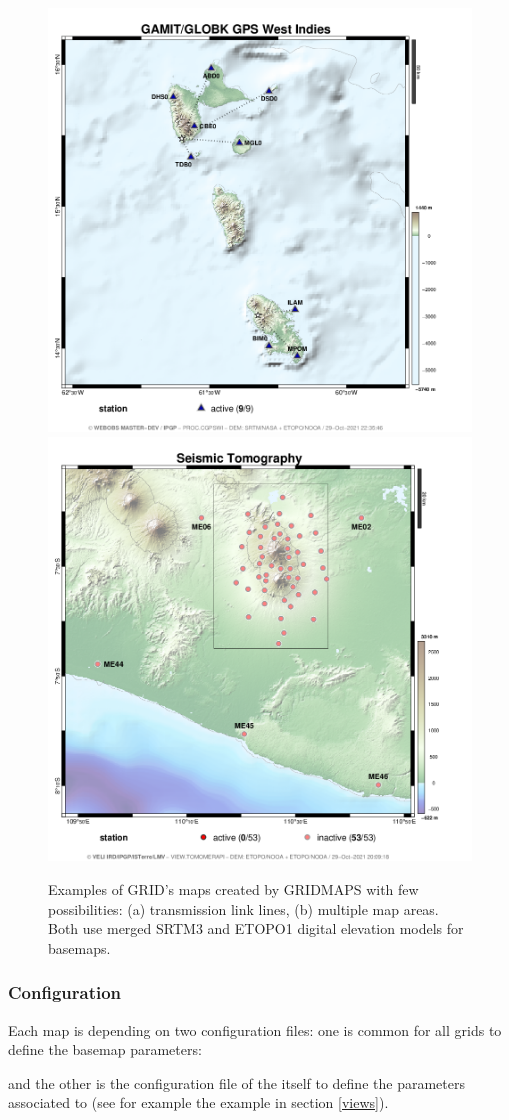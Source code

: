 \begin{figure}
\includegraphics[height=.5\textwidth]{figures/PROC_CGPSWI_map.png}
\includegraphics[height=.5\textwidth]{figures/VIEW_TOMOMERAPI_map.png}
\caption{Examples of GRID's maps created by GRIDMAPS with few possibilities: (a) transmission link lines, (b) multiple map areas. Both use merged SRTM3 and ETOPO1 digital elevation models for basemaps.}
\end{figure}

\subsubsection{Configuration}

Each  map is depending on two configuration files: one is common for all grids to define the basemap parameters:



and the other is the configuration file of the  itself to define the parameters associated to  (see for example the  example in section \ref{views}).

